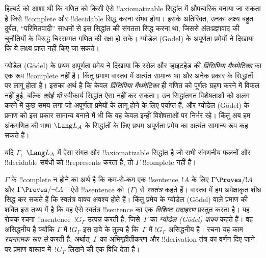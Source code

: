 \documentclass[../../../include/open-logic-section]{subfiles}
\begin{document}


हिल्बर्ट को आशा थी कि गणित को किसी ऐसे !!{axiomatizable} सिद्धांत में
औपचारिक बनाया जा सकता है जिसे !!{complete} और !!{decidable} सिद्ध करना संभव
होगा। इसके अतिरिक्त, उनका लक्ष्य बहुत दुर्बल, ``परिमितवादी'' साधनों से इस
सिद्धांत की संगतता सिद्ध करना था, जिससे अंतःप्रज्ञावाद की चुनौतियों के विरुद्ध
चिरसम्मत गणित की रक्षा हो सके। ग्योडेल (G\"odel) के अपूर्णता प्रमेयों ने
दिखाया कि ये लक्ष्य प्राप्त नहीं किए जा सकते।

ग्योडेल (G\"odel) के प्रथम अपूर्णता प्रमेय ने दिखाया कि रसेल और व्हाइटहेड की
\emph{प्रिंसिपिया मैथमेटिका} का एक रूप !!{complete} नहीं है। किंतु प्रमाण
वास्तव में अत्यंत सामान्य था और अनेक प्रकार के सिद्धांतों पर लागू होता है।
इसका अर्थ है कि केवल \emph{प्रिंसिपिया मैथमेटिका} ही गणित को पूर्णतः ग्रहण
करने में विफल नहीं हुई, बल्कि \emph{कोई भी} स्वीकार्य सिद्धांत ऐसा नहीं कर
सकता। उन सिद्धांतगत विशेषताओं को अलग करने में कुछ समय लगा जो अपूर्णता
प्रमेयों के लागू होने के लिए पर्याप्त हैं, और ग्योडेल (G\"odel) के प्रमाण को
इस प्रकार सामान्य बनाने में भी कि वह केवल इन्हीं विशेषताओं पर निर्भर रहे।
किंतु अब हम अंकगणित की भाषा $\Lang L_A$ के सिद्धांतों के लिए प्रथम अपूर्णता
प्रमेय का अत्यंत सामान्य रूप कह सकते हैं।

\begin{thm}
यदि $\Gamma$,~$\Lang L_A$ में ऐसा संगत और !!{axiomatizable} सिद्धांत है जो
सभी संगणनीय फलनों और !!{decidable} संबंधों को !!{represents} करता है, तो
$\Gamma$ !!{complete} नहीं है।
\end{thm}

$\Gamma$ के !!{complete} न होने का अर्थ है कि कम-से-कम एक !!{sentence}~$!A$
के लिए $\Gamma \Proves/ !A$ और $\Gamma \Proves/ \lnot !A$। ऐसे
!!a{sentence} को~($\Gamma)$ से \emph{स्वतंत्र} कहते हैं। वास्तव में हम अपेक्षाकृत
शीघ्र सिद्ध कर सकते हैं कि स्वतंत्र वाक्य अवश्य होते हैं। किंतु प्रमेय के
ग्योडेल (G\"odel) वाले प्रमाण की शक्ति इस तथ्य में है कि वह ऐसे स्वतंत्र
!!{sentence} का एक \emph{विशिष्ट उदाहरण} प्रस्तुत करता है। यह रोचक रचना
!!a{sentence}~$!G_\Gamma$ उत्पन्न करती है, जिसे~$\Gamma$ का \emph{ग्योडेल (G\"odel)
 वाक्य} कहते हैं। वह असिद्धनीय है क्योंकि $\Gamma$ में $!G_\Gamma$
इस दावे के तुल्य है कि~$\Gamma$ में $!G_\Gamma$ असिद्धनीय है। रचना यह काम
\emph{रचनात्मक रूप से} करती है; अर्थात्~$\Gamma$ का अभिगृहीतीकरण और
!!{derivation} तंत्र का वर्णन दिए जाने पर प्रमाण वास्तव में~$!G_\Gamma$ लिखने
की एक विधि देता है।
\end{document}
